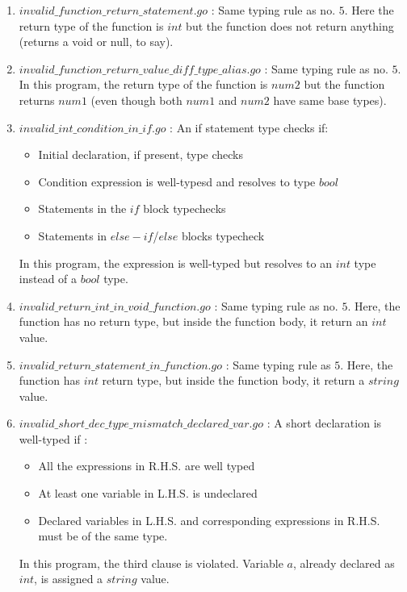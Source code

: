 \documentclass[preprint,12pt]{elsarticle}
\begin{document}
\begin{enumerate}
\item $invalid\_function\_return\_statement.go$ : Same typing rule as no. $5$. Here the return type of the function is $int$ but the function does not return anything (returns a void or null, to say).

\item $invalid\_function\_return\_value\_diff\_type\_alias.go$ : Same typing rule as no. $5$. In this program, the return type of the function is $num2$ but the function returns $num1$ (even though both $num1$ and $num2$ have same base types).

\item $invalid\_int\_condition\_in\_if.go$ : An if statement type checks if:
\begin{itemize}
\item Initial declaration, if present, type checks
\item Condition expression is well-typesd and resolves to type $bool$
\item Statements in the $if$ block typechecks
\item Statements in $else-if$/$else$ blocks typecheck
\end{itemize}
In this program, the expression is well-typed but resolves to an $int$ type instead of a $bool$ type.

\item $invalid\_return\_int\_in\_void\_function.go$ : Same typing rule as no. $5$. Here, the function has no return type, but inside the function body, it return an $int$ value.

\item $invalid\_return\_statement\_in\_function.go$ : Same typing rule as $5$. Here, the function has $int$ return type, but inside the function body, it return a $string$ value.

\item $invalid\_short\_dec\_type\_mismatch\_declared\_var.go$ : A short declaration is well-typed if : 
\begin{itemize}
\item All the expressions in R.H.S. are well typed
\item At least one variable in L.H.S. is undeclared
\item Declared variables in L.H.S. and corresponding expressions in R.H.S. must be of the same type.
\end{itemize}
In this program, the third clause is violated. Variable $a$, already declared as $int$, is assigned a $string$ value.


\end{enumerate}
\end{document}
